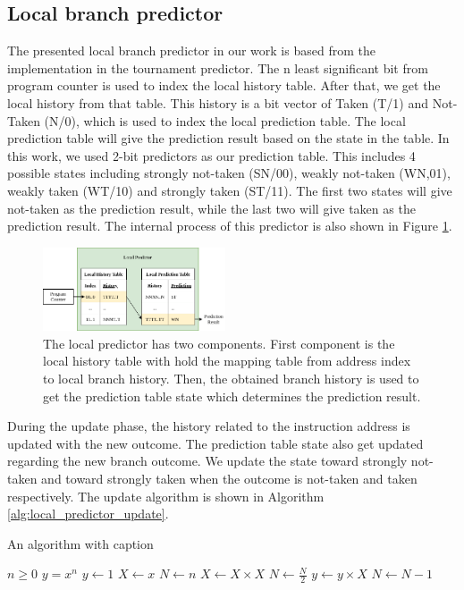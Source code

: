 \documentclass[conference]{IEEEtran}
\begin{document}
\subsection{Local branch predictor}

The presented local branch predictor in our work is based from the implementation in the tournament
predictor. The n least significant bit from program counter is used to index the local history table.
After that, we get the local history from that table. This history is a bit vector of Taken (T/1) and Not-Taken
(N/0), which is used to index the local prediction table. The local prediction table will give the
prediction result based on the state in the table. In this work, we used 2-bit predictors as our
prediction table. This includes 4 possible states including strongly not-taken (SN/00),
weakly not-taken (WN,01), weakly taken (WT/10) and strongly taken (ST/11). The first two states
will give not-taken as the prediction result, while the last two will give taken as the prediction
result. The internal process of this predictor is also shown in Figure \ref{fig:local_predictor}.

\begin{figure}[h]
    \centering
    \includegraphics[width=0.48\textwidth]{imgs/local_predictor}
    \caption{The local predictor has two components. First component is the local history table with
    hold the mapping table from address index to local branch history. Then, the obtained branch history
    is used to get the prediction table state which determines the prediction result.}
    \label{fig:local_predictor}
\end{figure}

During the update phase, the history related to the instruction address is updated with the new outcome.
The prediction table state also get updated regarding the new branch outcome. We update the state toward
strongly not-taken and toward strongly taken when the outcome is not-taken and taken respectively. The
update algorithm is shown in Algorithm \ref{alg:local_predictor_update}.

\begin{algorithm}
\caption{An algorithm with caption}\label{alg:local_predictor_update}
\begin{algorithmic}
\Require $n \geq 0$
\Ensure $y = x^n$
\State $y \gets 1$
\State $X \gets x$
\State $N \gets n$
    \State $X \gets X \times X$
    \State $N \gets \frac{N}{2}$  
    \State $y \gets y \times X$
    \State $N \gets N - 1$
\EndIf
\EndWhile
\end{algorithmic}
\end{algorithm}
\end{document}
